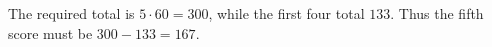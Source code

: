 The required total is $5\cdot60=300$, while the first four total $133$. Thus the fifth score must be $300-133=\boxed{167}$.
